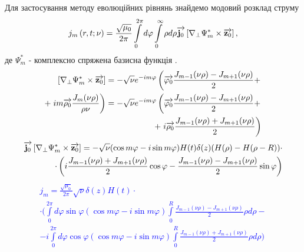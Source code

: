 %
Для застосування методу еволюційних рівнянь знайдемо модовий розклад 
струму
%
\begin{equation} \label{eq:jm_base}
j_m \left( r, t; \nu \right) = \frac{\sqrt{\mu_0}}{2\pi} 
\int \limits_{0}^{2\pi} d \varphi \int \limits_{0}^{\infty} \rho d \rho 
\overrightarrow{\mathbf j_0} \left[  \nabla_\perp \Psi_m^*  \times  \overrightarrow{\mathbf z_0}  \right],
\end{equation}
%
де $ \Psi_m^* $ - комплексно спряжена базисна функція \cite{imp:Dumin2010}.
%
\textcolor{blue} { \begin{equation*} \begin{aligned}
\left[  \nabla_\perp \Psi_m^*  \times  \overrightarrow{\mathbf z_0}  \right] = 
- \sqrt{\nu} e^{-im\varphi} \left( 
\overrightarrow{\mathbf \varphi_0} \frac{J_{m-1} (\nu \rho) - J_{m+1} (\nu \rho)}{2} + 
\right. \\ + \left. i m \overrightarrow{\mathbf \rho_0} \frac{J_m (\nu \rho)}
{\rho \nu} \right) = - \sqrt{\nu} e^{-im\varphi} \left( 
\overrightarrow{\mathbf \varphi_0} \frac{J_{m-1} (\nu \rho) - J_{m+1} (\nu \rho)}{2} + 
\right. \\ + \left. i \overrightarrow{\mathbf \rho_0} \frac{J_{m-1} (\nu \rho) + 
J_{m+1} (\nu \rho)}{2} \right)
\end{aligned} \end{equation*} }
%
\textcolor{blue} { \begin{equation*} \begin{aligned}
\overrightarrow{\mathbf j_0} \left[  \nabla_\perp \Psi_m^*  \times  \overrightarrow{\mathbf z_0}  \right] = 
- \sqrt{\nu} ( \cos m \varphi - i \sin m \varphi ) 
H(t) \delta(z) ( H(\rho) - H(\rho - R) ) \cdot \\ \cdot \left( 
i \frac{J_{m-1} (\nu \rho) + J_{m+1} (\nu \rho)}{2} \cos \varphi
- \frac{J_{m-1} (\nu \rho) - J_{m+1} (\nu \rho)}{2} \sin \varphi
\right)
\end{aligned} \end{equation*} }
%
\textcolor{blue} { \begin{equation*} \begin{aligned}
j_m = \frac{\sqrt{\mu_0}}{2\pi} \sqrt{\nu} \delta(z) H(t) \cdot \\
\cdot \Big( \int \limits_{0}^{2\pi} d \varphi \sin \varphi 
( \cos m \varphi - i \sin m \varphi) \int \limits_{0}^{R} 
\frac{J_{m-1} (\nu \rho) - J_{m+1} (\nu \rho)}{2} \rho d \rho - \\
- i \int \limits_{0}^{2\pi} d \varphi \cos \varphi 
( \cos m \varphi - i \sin m \varphi) \int \limits_{0}^{R} 
\frac{J_{m-1} (\nu \rho) + J_{m+1} (\nu \rho)}{2} \rho d \rho \Big)
\end{aligned} \end{equation*} }
